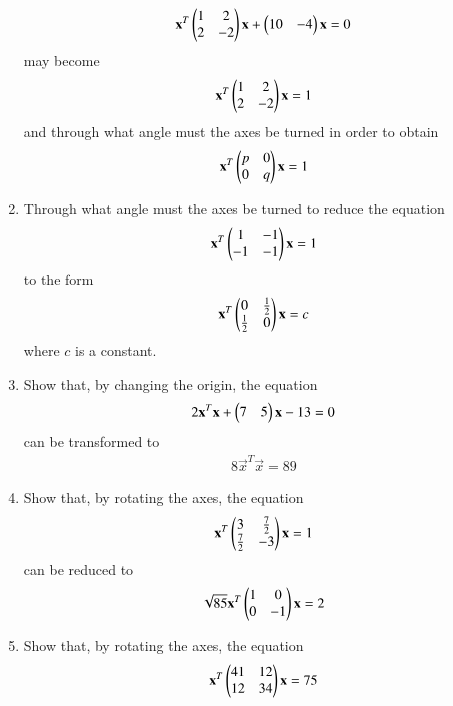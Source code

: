 \begin{enumerate}[label=\arabic*.,ref=\thesubsection.\theenumi]
\begin{align}
    \mathbf{x}^T\begin{pmatrix}1 & 2\\2 & -2\end{pmatrix}\mathbf{x}+\begin{pmatrix}10 & -4\end{pmatrix}\mathbf{x}=0 \label{eq:solutions/3/4/6/eq:q1}
\end{align}
may become
\begin{align}
    \mathbf{x}^T\begin{pmatrix}1 & 2\\2 & -2\end{pmatrix}\mathbf{x}=1\label{eq:solutions/3/4/6/eq:q2}
\end{align}
and through what angle must the axes be turned in order to obtain
\begin{align}
    \mathbf{x}^T\begin{pmatrix}p & 0\\0 & q\end{pmatrix}\mathbf{x}=1\label{eq:solutions/3/4/6/eq:q3}
\end{align}
\solution

\item Through what angle must the axes be turned to reduce the equation
\begin{align}
\mathbf{x}^T\begin{pmatrix}1 & -1\\-1 & -1\end{pmatrix}\mathbf{x}=1
\end{align}
to the form
\begin{align}
\mathbf{x}^T\begin{pmatrix}0 & \frac{1}{2}\\ \frac{1}{2} & 0\end{pmatrix}\mathbf{x} = c
\end{align}
where $c$ is a constant.
\item 
Show that, by changing the origin, the equation
\begin{align}
2\mathbf{x}^T\mathbf{x}+\begin{pmatrix}7&5\end{pmatrix}\mathbf{x}-13=0
\label{eq:solutions/3/4/8/eq:a0}
\end{align}
can be transformed to
\begin{align}
8\vec{x}^T\vec{x}=89
\label{eq:solutions/3/4/8/eq:a1}
\end{align}
\solution

\item Show that, by rotating the axes, the equation
\begin{align}
\mathbf{x}^T\begin{pmatrix}3 & \frac{7}{2}\\ \frac{7}{2} & -3\end{pmatrix}\mathbf{x}= 1
\end{align}
can be reduced to 
\begin{align}
\sqrt{85}\mathbf{x}^T\begin{pmatrix}1 & 0\\ 0 & -1\end{pmatrix}\mathbf{x}= 2
\end{align}
\item Show that, by rotating the axes, the equation
\begin{align}
\mathbf{x}^T\begin{pmatrix}41 & 12\\ 12 & 34\end{pmatrix}\mathbf{x}= 75
\label{eq:solutions/3/4/10/1}
\end{align}

\end{enumerate}
